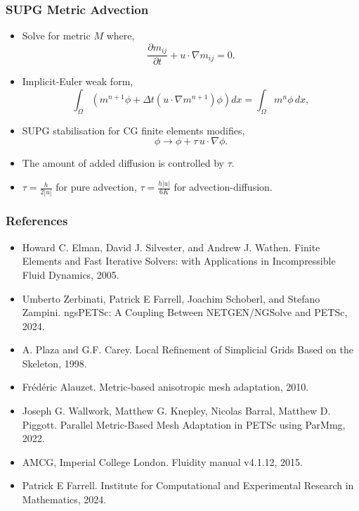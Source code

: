 \documentclass{beamer}
\begin{document}
  \begin{frame}
	\frametitle{SUPG Metric Advection}
	\begin{itemize}
		\item Solve for metric $M$ where, \[\frac{\partial m_{ij}}{\partial t} + u \cdot \nabla m_{ij} = 0.\]
		\item Implicit-Euler weak form, \[\int_\Omega \left( m^{n+1} \phi + \Delta t (u \cdot \nabla m^{n+1}) \phi \right) dx = \int_\Omega m^n \phi \, dx,\]
		\item SUPG stabilisation for CG finite elements modifies, \[\phi \rightarrow \phi + \tau \, u \cdot \nabla \phi.\]
		\item The amount of added diffusion is controlled by $\tau$.
		\item $\tau = \frac{h}{2|u|}$ for pure advection, $\tau = \frac{h|u|}{6K}$ for advection-diffusion.
		\end{itemize}
  \end{frame}


  \begin{frame}
	\frametitle{References}
	\begin{itemize}
		\item Howard C. Elman, David J. Silvester, and Andrew J. Wathen. Finite Elements and Fast Iterative Solvers: with Applications in Incompressible Fluid Dynamics, 2005.

		\vfill
		
		\item Umberto Zerbinati, Patrick E Farrell, Joachim Schoberl, and Stefano Zampini. ngsPETSc: A Coupling Between NETGEN/NGSolve and PETSc, 2024.
		
		\vfill

		\item A. Plaza and G.F. Carey. Local Refinement of Simplicial Grids Based on the Skeleton, 1998. 
		
		\vfill

		\item Frédéric Alauzet. Metric-based anisotropic mesh adaptation, 2010.
		
		\vfill

		\item Joseph G. Wallwork, Matthew G. Knepley, Nicolas Barral, Matthew D. Piggott. Parallel Metric-Based Mesh Adaptation in PETSc using ParMmg, 2022.

		\vfill

		\item AMCG, Imperial College London. Fluidity manual v4.1.12, 2015. 
		
		\vfill

		\item Patrick E Farrell.  Institute for Computational and Experimental Research in Mathematics, 2024.
	\end{itemize}
  \end{frame}




\end{document}
